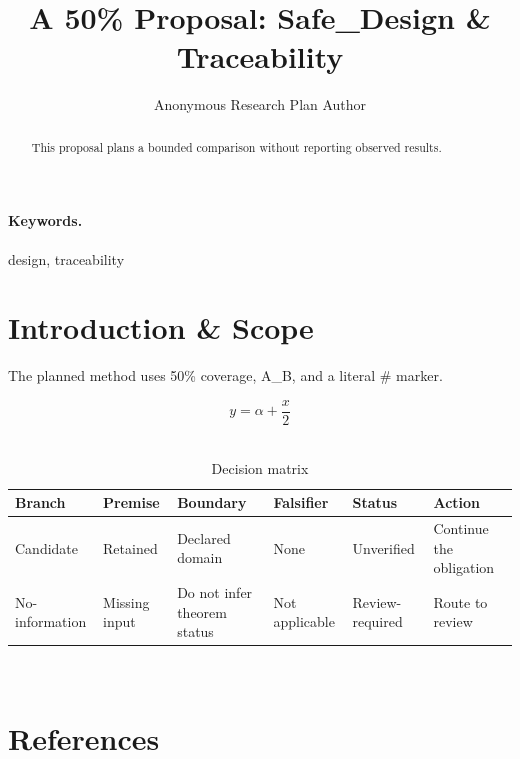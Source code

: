 \documentclass{article}
\title{A 50\% Proposal: Safe\_Design \& Traceability}
\author{Anonymous Research Plan Author}
\begin{document}
\maketitle
\begin{abstract}
This proposal plans a bounded comparison without reporting observed results.
\end{abstract}
\paragraph{Keywords.} design, traceability
\section{Introduction \& Scope}
The planned method uses 50\% coverage, A\_B, and a literal \# marker.~\cite{cite_example_1}

\begin{equation}
y = \alpha + \frac{x}{2}
\label{eq:introduction-B2}
\end{equation}~\cite{cite_example_1}

\begin{table}[htbp]
\centering
\footnotesize
\setlength{\tabcolsep}{3pt}
\renewcommand{\arraystretch}{1.12}
\caption{Decision matrix}
\label{tab:introduction-B3}
\begin{tabular}{|p{}|p{}|p{}|p{}|p{}|p{}|}
\hline
Branch & Premise & Boundary & Falsifier & Status & Action \\\hline
Candidate & Retained & Declared domain & None & Unverified & Continue the obligation \\\hline
No-information & Missing input & Do not infer theorem status & Not applicable & Review-required & Route to review \\\hline
\end{tabular}
\end{table}~\cite{cite_example_1}
\section*{References}


\end{document}
